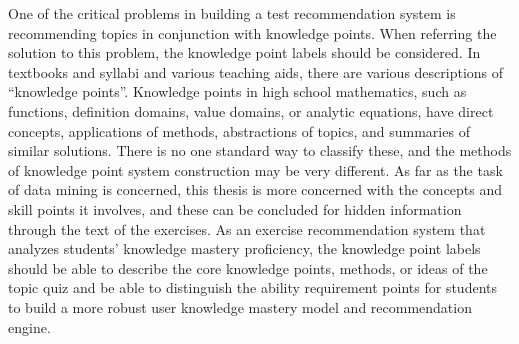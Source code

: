 One of the critical problems in building a test recommendation system is recommending topics in conjunction with knowledge points. When referring the solution to this problem, the knowledge point labels should be considered. In textbooks and syllabi and various teaching aids, there are various descriptions of ``knowledge points''. Knowledge points in high school mathematics, such as functions, definition domains, value domains, or analytic equations, have direct concepts, applications of methods, abstractions of topics, and summaries of similar solutions. There is no one standard way to classify these, and the methods of knowledge point system construction may be very different. As far as the task of data mining is concerned, this thesis is more concerned with the concepts and skill points it involves, and these can be concluded for hidden information through the text of the exercises. As an exercise recommendation system that analyzes students' knowledge mastery proficiency, the knowledge point labels should be able to describe the core knowledge points, methods, or ideas of the topic quiz and be able to distinguish the ability requirement points for students to build a more robust user knowledge mastery model and recommendation engine.



